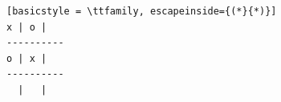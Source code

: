 \begin{lstlisting}[basicstyle = \ttfamily, escapeinside={(*}{*)}]
x | o |  
----------
o | x |  
----------
  |   |  
\end{lstlisting}